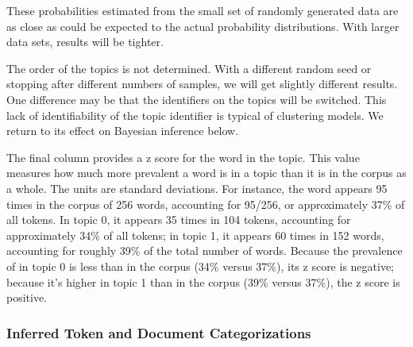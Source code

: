 These probabilities estimated from the small set of randomly generated
data are as close as could be expected to the actual probability
distributions.  With larger data sets, results will be tighter.

The order of the topics is not determined.  With a different random
seed or stopping after different numbers of samples, we will get
slightly different results.  One difference may be that the
identifiers on the topics will be switched.  This lack of
identifiability of the topic identifier is typical of clustering
models.  We return to its effect on Bayesian inference below.

The final column provides a z score for the word in the topic.  This
value measures how much more prevalent a word is in a topic than it is
in the corpus as a whole.  The units are standard deviations.  For
instance, the word  appears 95 times in the corpus
of 256 words, accounting for 95/256, or approximately 37\% of all
tokens.  In topic 0, it appears 35 times in 104 tokens, accounting for
approximately 34\% of all tokens; in topic 1, it appears 60 times in
152 words, accounting for roughly 39\% of the total number of words.
Because the prevalence of  in topic 0 is less than
in the corpus (34\% versus 37\%), its z score is negative; because
it's higher in topic 1 than in the corpus (39\% versus 37\%), the z
score is positive.   

\subsubsection{Inferred Token and Document Categorizations}

